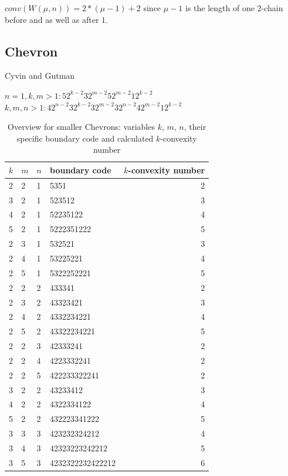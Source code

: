 \documentclass[a4paper,10pt]{article}
\begin{document}
{$conv(W(\mu,n)) = 2*(\mu-1)+2$ since $\mu-1$ is the length of one $2$-chain before 
and as well as after $1$.


\subsection{Chevron}
Cyvin and Gutman~\cite[p.~111]{cyvin_1988}


\cite{gordon_1952}
\cite{cyvin_1985}

$n = 1, k,m > 1 : 5 2^{k-2} 3 2^{m-2} 5 2^{m-2} 1 2^{k-2}$\\
$k,m,n > 1 : 4 2^{n-2} 3 2^{k-2} 3 2^{m-2} 3 2^{n-2} 4 2^{m-2} 1 2^{k-2}$

\begin{table}
 \caption{Overview for smaller Chevrons: variables $k$, $m$, $n$, their specific boundary code and calculated $k$-convexity number}
 \medskip
 \begin{tabular}{|l l l l r|}
 \hline
  $k$ & $m$ & $n$ & boundary code & $k$-convexity number\\
  \hline
  2 & 2 & 1 & 5351 & 2\\
  \hline
  3 & 2 & 1 & 523512 & 3\\
  4 & 2 & 1 & 52235122 & 4\\
  5 & 2 & 1 & 5222351222 & 5\\
  \hline
  2 & 3 & 1 & 532521 & 3\\
  2 & 4 & 1 & 53225221 & 4\\
  2 & 5 & 1 & 5322252221 & 5\\
  \hline
  2 & 2 & 2 & 433341 & 2\\
  2 & 3 & 2 & 43323421 & 3\\
  2 & 4 & 2 & 4332234221 & 4\\
  2 & 5 & 2 & 43322234221 & 5\\
  \hline 
  2 & 2 & 3 & 42333241 & 2\\
  2 & 2 & 4 & 4223332241 & 2\\
  2 & 2 & 5 & 422233322241 & 2\\
  \hline
  3 & 2 & 2 & 43233412 & 3\\
  4 & 2 & 2 & 4322334122 & 4\\
  5 & 2 & 2 & 432223341222 & 5\\
  \hline
  3 & 3 & 3 & 423232324212 & 4\\
  3 & 4 & 3 & 42323223242212 & 5\\
  3 & 5 & 3 & 4232322232422212 & 6\\
  \hline
 \end{tabular}
\end{table}

}
\end{document}
